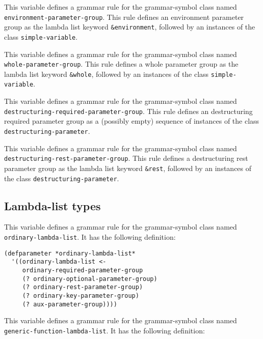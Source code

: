 
This variable defines a grammar rule for the grammar-symbol class
named \texttt{environment-parameter-group}.  This rule defines an
environment parameter group as the lambda list keyword
\texttt{\&environment}, followed by an instances of the class
\texttt{simple-variable}.


This variable defines a grammar rule for the grammar-symbol class
named \texttt{whole-parameter-group}.  This rule defines a whole
parameter group as the lambda list keyword \texttt{\&whole}, followed
by an instances of the class \texttt{simple-variable}.


This variable defines a grammar rule for the grammar-symbol class
named \texttt{destructuring-required-parameter-group}.  This rule
defines an destructuring required parameter group as a (possibly
empty) sequence of instances of the class
\texttt{destructuring-parameter}.


This variable defines a grammar rule for the grammar-symbol class
named \texttt{destructuring-rest-parameter-group}.  This rule defines
a destructuring rest parameter group as the lambda list keyword
\texttt{\&rest}, followed by an instances of the class
\texttt{destructuring-parameter}.

\subsection{Lambda-list types}


This variable defines a grammar rule for the grammar-symbol class
named \texttt{ordinary-lambda-list}.  It has the following definition:

\begin{verbatim}
(defparameter *ordinary-lambda-list*
  '((ordinary-lambda-list <-
     ordinary-required-parameter-group
     (? ordinary-optional-parameter-group)
     (? ordinary-rest-parameter-group)
     (? ordinary-key-parameter-group)
     (? aux-parameter-group))))
\end{verbatim}


This variable defines a grammar rule for the grammar-symbol class
named \texttt{generic-function-lambda-list}.  It has the following
definition:

